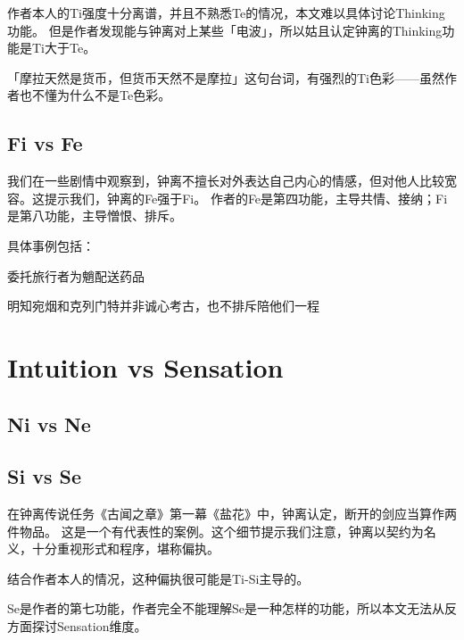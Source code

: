 \documentclass[a4paper,11pt]{article}
\begin{document}
作者本人的Ti强度十分离谱，并且不熟悉Te的情况，本文难以具体讨论Thinking功能。
但是作者发现能与钟离对上某些「电波」，所以姑且认定钟离的Thinking功能是Ti大于Te。

「摩拉天然是货币，但货币天然不是摩拉」这句台词，有强烈的Ti色彩——虽然作者也不懂为什么不是Te色彩。

\subsection{Fi vs Fe}

我们在一些剧情中观察到，钟离不擅长对外表达自己内心的情感，但对他人比较宽容。这提示我们，钟离的Fe强于Fi。
作者的Fe是第四功能，主导共情、接纳；Fi是第八功能，主导憎恨、排斥。

具体事例包括：

\begin{compactitem}
	\item 委托旅行者为魈配送药品
	\item 明知宛烟和克列门特并非诚心考古，也不排斥陪他们一程
\end{compactitem}














\section{Intuition vs Sensation}

\subsection{Ni vs Ne}

\subsection{Si vs Se}

在钟离传说任务《古闻之章》第一幕《盐花》中，钟离认定，断开的剑应当算作两件物品。
这是一个有代表性的案例。这个细节提示我们注意，钟离以契约为名义，十分重视形式和程序，堪称偏执。

结合作者本人的情况，这种偏执很可能是Ti-Si主导的。

Se是作者的第七功能，作者完全不能理解Se是一种怎样的功能，所以本文无法从反方面探讨Sensation维度。
\end{document}
